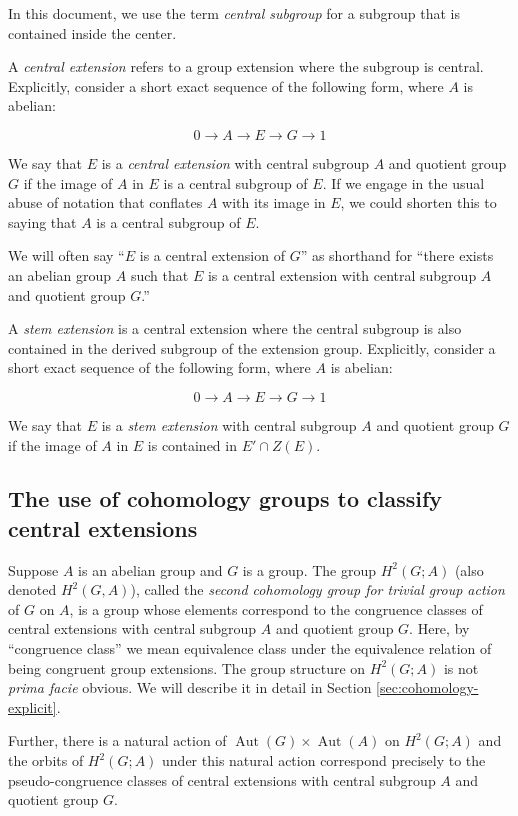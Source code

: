 In this document, we use the term {\em central subgroup} for a
subgroup that is contained inside the center.

A {\em central extension} refers to a group extension where the
subgroup is central. Explicitly, consider a short exact sequence of
the following form, where $A$ is abelian:

$$0 \to A \to E \to G \to 1$$

We say that $E$ is a {\em central extension} with central subgroup $A$
and quotient group $G$ if the image of $A$ in $E$ is a central
subgroup of $E$. If we engage in the usual abuse of notation that
conflates $A$ with its image in $E$, we could shorten this to saying
that $A$ is a central subgroup of $E$.

We will often say ``$E$ is a central extension of $G$'' as shorthand
for ``there exists an abelian group $A$ such that $E$ is a central
extension with central subgroup $A$ and quotient group $G$.''

A {\em stem extension} is a central extension where the central
subgroup is also contained in the derived subgroup of the extension
group. Explicitly, consider a short exact sequence of the following
form, where $A$ is abelian:

$$0 \to A \to E \to G \to 1$$

We say that $E$ is a {\em stem extension} with central subgroup $A$
and quotient group $G$ if the image of $A$ in $E$ is contained in $E'
\cap Z(E)$.

\subsection{The use of cohomology groups to classify central extensions}\label{sec:second-cohomology-group-classify-extensions}

Suppose $A$ is an abelian group and $G$ is a group. The group
$H^2(G;A)$ (also denoted $H^2(G,A)$), called the {\em second
  cohomology group for trivial group action} of $G$ on $A$, is a group
whose elements correspond to the congruence classes of central
extensions with central subgroup $A$ and quotient group $G$. Here, by
``congruence class'' we mean equivalence class under the equivalence
relation of being congruent group extensions. The group structure on
$H^2(G;A)$ is not {\em prima facie} obvious. We will describe it in
detail in Section \ref{sec:cohomology-explicit}.

Further, there is a natural action of $\operatorname{Aut}(G) \times
\operatorname{Aut}(A)$ on $H^2(G;A)$ and the orbits of $H^2(G;A)$
under this natural action correspond precisely to the
pseudo-congruence classes of central extensions with central subgroup
$A$ and quotient group $G$.


